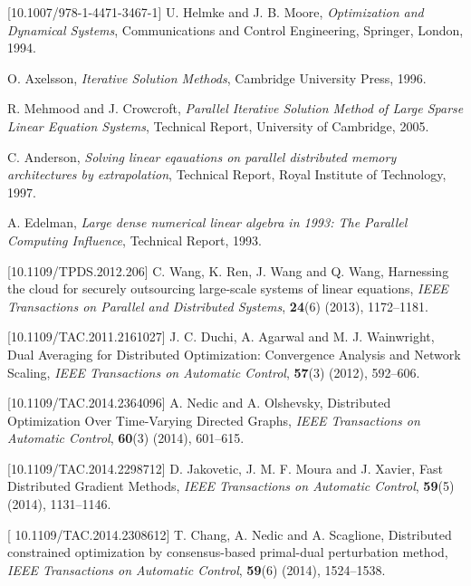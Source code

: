 \documentclass{aims}
\begin{document}
\begin{thebibliography}{99}
  [10.1007/978-1-4471-3467-1]
     \newblock U. Helmke and J. B. Moore,
     \newblock \emph{Optimization and Dynamical Systems},
     \newblock Communications and Control Engineering,  Springer, London, 1994.

     \newblock O. Axelsson,
     \newblock \emph{Iterative Solution Methods},
     \newblock Cambridge University Press, 1996.

     \newblock R. Mehmood and J. Crowcroft,
     \newblock \emph{Parallel Iterative Solution Method of Large Sparse Linear Equation Systems},
     \newblock Technical Report, University of Cambridge, 2005.

     \newblock C. Anderson,
     \newblock \emph{Solving linear eqauations on parallel distributed memory architectures by extrapolation},
     \newblock Technical Report, Royal Institute of Technology, 1997.

     \newblock A. Edelman,
     \newblock \emph{Large dense numerical linear algebra in 1993: The Parallel Computing Influence},
     \newblock Technical Report, 1993.


 [10.1109/TPDS.2012.206]
    \newblock C. Wang, K. Ren, J. Wang and Q. Wang, \newblock Harnessing the cloud for securely outsourcing large-scale systems of linear equations,
    \newblock \emph{IEEE Transactions on Parallel and Distributed Systems}, \textbf{24}(6) (2013), 1172--1181.

 [10.1109/TAC.2011.2161027]
    \newblock J. C. Duchi, A. Agarwal and M. J. Wainwright, \newblock Dual Averaging for Distributed Optimization: Convergence Analysis and Network Scaling,
    \newblock \emph{IEEE Transactions on Automatic Control}, \textbf{57}(3) (2012), 592--606.


 [10.1109/TAC.2014.2364096]
    \newblock A. Nedic and A. Olshevsky, \newblock Distributed Optimization Over Time-Varying Directed Graphs,
    \newblock \emph{IEEE Transactions on Automatic Control}, \textbf{60}(3) (2014), 601--615.

 [10.1109/TAC.2014.2298712]
    \newblock D. Jakovetic, J. M. F. Moura and J. Xavier, \newblock Fast Distributed Gradient Methods,
    \newblock \emph{IEEE Transactions on Automatic Control}, \textbf{59}(5) (2014), 1131--1146.

 [ 10.1109/TAC.2014.2308612]
    \newblock T. Chang, A. Nedic and A. Scaglione, \newblock Distributed constrained optimization by consensus-based primal-dual perturbation method,
    \newblock \emph{IEEE Transactions on Automatic Control}, \textbf{59}(6) (2014), 1524--1538.


\end{thebibliography}
\end{document}
